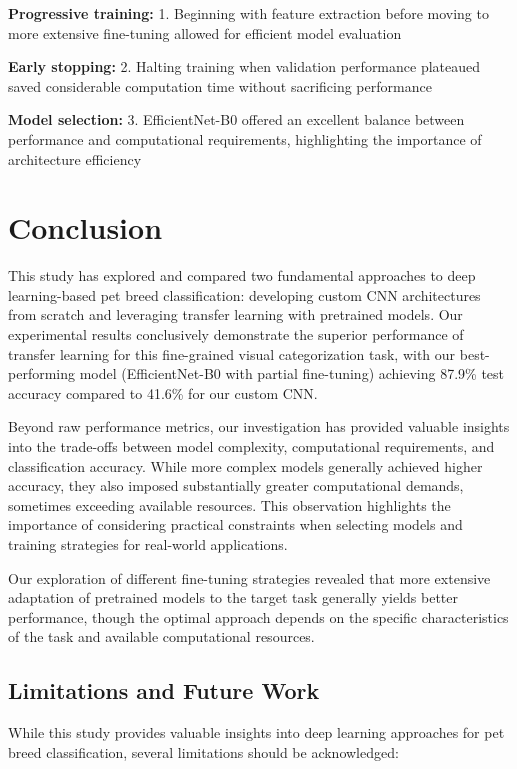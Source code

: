 \documentclass[
]{article}
\begin{document}
\textbf{Progressive training:} 1. Beginning with feature extraction
before moving to more extensive fine-tuning allowed for efficient model
evaluation

\textbf{Early stopping:} 2. Halting training when validation performance
plateaued saved considerable computation time without sacrificing
performance

\textbf{Model selection:} 3. EfficientNet-B0 offered an excellent
balance between performance and computational requirements, highlighting
the importance of architecture efficiency

\section{Conclusion}\label{conclusion}

This study has explored and compared two fundamental approaches to deep
learning-based pet breed classification: developing custom CNN
architectures from scratch and leveraging transfer learning with
pretrained models. Our experimental results conclusively demonstrate the
superior performance of transfer learning for this fine-grained visual
categorization task, with our best-performing model (EfficientNet-B0
with partial fine-tuning) achieving 87.9\% test accuracy compared to
41.6\% for our custom CNN.

Beyond raw performance metrics, our investigation has provided valuable
insights into the trade-offs between model complexity, computational
requirements, and classification accuracy. While more complex models
generally achieved higher accuracy, they also imposed substantially
greater computational demands, sometimes exceeding available resources.
This observation highlights the importance of considering practical
constraints when selecting models and training strategies for real-world
applications.

Our exploration of different fine-tuning strategies revealed that more
extensive adaptation of pretrained models to the target task generally
yields better performance, though the optimal approach depends on the
specific characteristics of the task and available computational
resources.

\subsection{Limitations and Future
Work}\label{limitations-and-future-work}

While this study provides valuable insights into deep learning
approaches for pet breed classification, several limitations should be
acknowledged:
\end{document}
